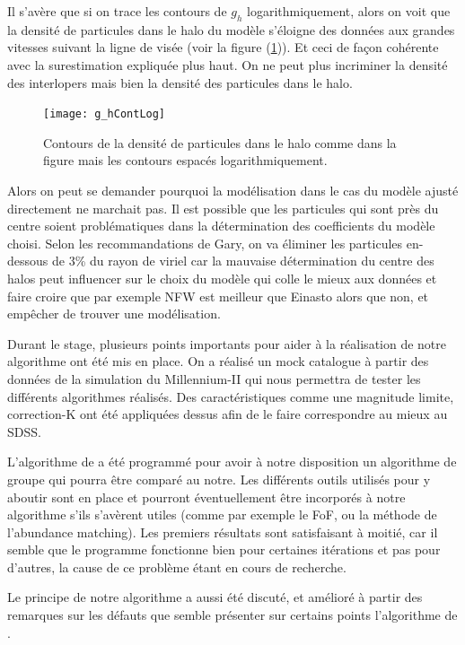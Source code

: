 Il s'avère que si on trace les contours de $g_h$ logarithmiquement, alors on voit que la densité de particules dans le halo du
modèle s'éloigne des données aux grandes vitesses suivant la ligne de visée (voir la figure (\ref{fig:ghcontlog})). Et ceci de
façon cohérente avec la surestimation expliquée plus haut. On ne peut plus incriminer la densité des interlopers mais bien la
densité des particules dans le halo.
\begin{figure}[htb]
	\centering
	\texttt{[image: g\_hContLog]}
	\caption{\footnotesize{}Contours de la densité de particules dans le halo comme dans la figure mais les contours espacés
	logarithmiquement.}
	\label{fig:ghcontlog}
\end{figure}
Alors on peut se demander pourquoi la modélisation dans le cas du modèle ajusté directement ne marchait pas. Il est possible que
les particules qui sont près du centre soient problématiques dans la détermination des coefficients du modèle choisi. Selon les
recommandations de Gary, on va éliminer les particules en-dessous de \num{3}\% du rayon de viriel car la mauvaise détermination du
centre des halos peut influencer sur le choix du modèle qui colle le mieux aux données et faire croire que par exemple NFW est
meilleur que Einasto alors que non, et empêcher de trouver une modélisation.

Durant le stage, plusieurs points importants pour aider à la réalisation de notre algorithme ont été mis en place. On a réalisé un
mock catalogue à partir des données de la simulation du Millennium-II qui nous permettra de tester les différents algorithmes
réalisés. Des caractéristiques comme une magnitude limite, correction-K ont été appliquées dessus afin de le faire correspondre au
mieux au SDSS.

L'algorithme de \citet{Yang+07} a été programmé pour avoir à notre disposition un algorithme de groupe qui pourra être comparé au
notre. Les différents outils utilisés pour y aboutir sont en place et pourront éventuellement être incorporés à notre algorithme
s'ils s'avèrent utiles (comme par exemple le FoF, ou la méthode de l'abundance matching). Les premiers résultats sont satisfaisant
à moitié, car il semble que le programme fonctionne bien pour certaines itérations et pas pour d'autres, la cause de ce problème
étant en cours de recherche.

Le principe de notre algorithme a aussi été discuté, et amélioré à partir des remarques sur les défauts que semble présenter sur
certains points l'algorithme de \citet{Yang+07}.

